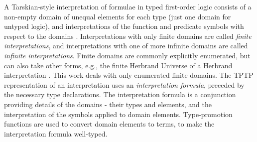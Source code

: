 \documentclass[letterpaper]{article}
\newcommand{\smalltt}[1]{\small \texttt{#1}}
\newenvironment{packed_itemize}{
\vspace*{-0.2em}
\begin{itemize}
\setlength{\partopsep}{0pt}
\setlength{\itemsep}{1pt}
\setlength{\parskip}{0pt}
\setlength{\parsep}{0pt}
}{\end{itemize}}
\begin{document}
{A Tarskian-style interpretation \cite{TV56} of formulae in typed first-order logic consists of a 
non-empty domain of unequal elements for each type (just one domain for untyped logic), and 
interpretations of the function and predicate symbols with respect to the domains \cite{Hun96}.
Interpretations with only finite domains are called {\em finite interpretations}, and
interpretations with one of more infinite domains are called {\em infinite interpretations}.
Finite domains are commonly explicitly enumerated, but can also take other forms, e.g., the 
finite Herbrand Universe of a Herbrand interpretation \cite{Her30}.
This work deals with only enumerated finite domains.
The TPTP representation of an interpretation uses an {\em interpretation formula}, preceded by 
the necessary type declarations.
The interpretation formula is a conjunction providing details of the domains - their types and 
elements, and the interpretation of the symbols applied to domain elements.
Type-promotion functions are used to convert domain elements to terms, to make the
interpretation formula well-typed.
}
\end{document}
